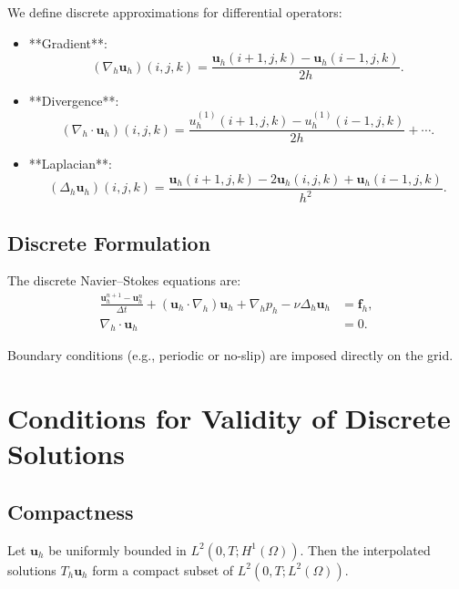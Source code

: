 \documentclass[12pt]{article}
\begin{document}
We define discrete approximations for differential operators:
\begin{itemize}
    \item **Gradient**:
    \begin{equation}
    (\nabla_h \mathbf{u}_h)(i,j,k) = \frac{\mathbf{u}_h(i+1,j,k) - \mathbf{u}_h(i-1,j,k)}{2h}.
    \end{equation}
    \item **Divergence**:
    \begin{equation}
    (\nabla_h \cdot \mathbf{u}_h)(i,j,k) = \frac{u_h^{(1)}(i+1,j,k) - u_h^{(1)}(i-1,j,k)}{2h} + \cdots.
    \end{equation}
    \item **Laplacian**:
    \begin{equation}
    (\Delta_h \mathbf{u}_h)(i,j,k) = \frac{\mathbf{u}_h(i+1,j,k) - 2\mathbf{u}_h(i,j,k) + \mathbf{u}_h(i-1,j,k)}{h^2}.
    \end{equation}
\end{itemize}

\subsection{Discrete Formulation}

The discrete Navier--Stokes equations are:
\begin{align}
\frac{\mathbf{u}_h^{n+1} - \mathbf{u}_h^n}{\Delta t} + (\mathbf{u}_h \cdot \nabla_h) \mathbf{u}_h + \nabla_h p_h - \nu \Delta_h \mathbf{u}_h &= \mathbf{f}_h, \label{eq:discrete-momentum} \\
\nabla_h \cdot \mathbf{u}_h &= 0. \label{eq:discrete-incompressibility}
\end{align}

Boundary conditions (e.g., periodic or no-slip) are imposed directly on the grid.

\section{Conditions for Validity of Discrete Solutions}

\subsection{Compactness}

\begin{theorem}[Compactness]
Let $\mathbf{u}_h$ be uniformly bounded in $L^2(0,T; H^1(\Omega))$. Then the interpolated solutions $T_h \mathbf{u}_h$ form a compact subset of $L^2(0,T; L^2(\Omega))$.
\end{theorem}
\end{document}
